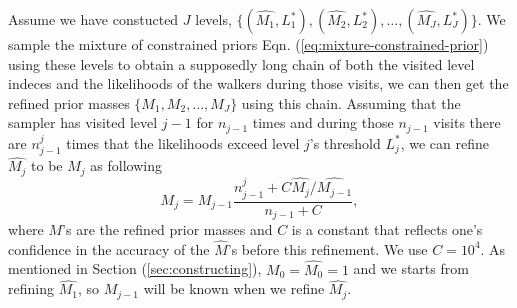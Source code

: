 \documentclass[letterpaper, preprint]{aastex}
\begin{document}
Assume we have constucted $J$ levels, $\{(\widehat{M_1},L_1^*),(\widehat{M_2},L_2^*), \ldots,(\widehat{M_J},L_J^*)\}$. We sample the mixture of constrained priors Eqn. (\ref{eq:mixture-constrained-prior}) using these levels to obtain a supposedly long chain of both the visited level indeces and the likelihoods of the walkers during those visits, we can then get the refined prior masses $\{M_1,M_2,\dots,M_J\}$ using this chain. Assuming that the sampler has visited level $j-1$ for $n_{j-1}$ times and during those $n_{j-1}$ visits there are $n_{j-1}^j$ times that the likelihoods exceed level $j$'s threshold $L^*_j$, we can refine $\widehat{M_j}$ to be $M_j$ as following \citep{brewer11a}
\begin{equation}
M_j = M_{j-1}\frac{n_{j-1}^j+C \widehat{M_j}/\widehat{M_{j-1}}}{n_{j-1}+C},
\label{eq:refinement}
\end{equation}
where $M$'s are the refined prior masses and $C$ is a constant that reflects one's confidence in the accuracy of the $\widehat{M}$'s before this refinement. We use $C=10^4$. As mentioned in Section (\ref{sec:constructing}), $M_0=\widehat{M_0}=1$ and we starts from refining $\widehat{M_1}$, so $M_{j-1}$ will be known when we refine $\widehat{M_j}$. 
\end{document}
